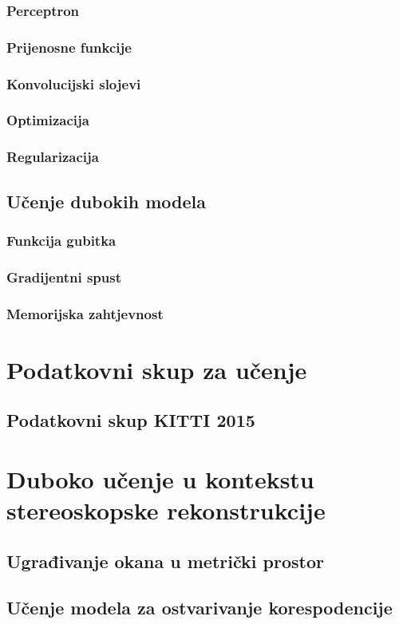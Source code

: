 \documentclass[times, utf8, zavrsni]{fer}
\begin{document}
\subsection{Perceptron}
\subsection{Prijenosne funkcije}
\subsection{Konvolucijski slojevi}
\subsection{Optimizacija}
\subsection{Regularizacija}
\section{Učenje dubokih modela}
\subsection{Funkcija gubitka}
\subsection{Gradijentni spust}
\subsection{Memorijska zahtjevnost}
\chapter{Podatkovni skup za učenje}
\section{Podatkovni skup KITTI 2015}
\chapter{Duboko učenje u kontekstu stereoskopske rekonstrukcije}
\section{Ugrađivanje okana u metrički prostor}
\section{Učenje modela za ostvarivanje korespodencije}
\end{document}
